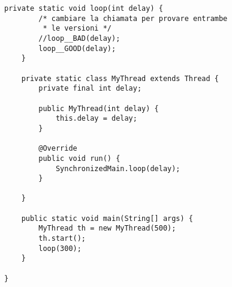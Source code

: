 \begin{lstlisting}[basicstyle=\small,]
    private static void loop(int delay) {
        /* cambiare la chiamata per provare entrambe
         * le versioni */
        //loop__BAD(delay);
        loop__GOOD(delay);
    }

    private static class MyThread extends Thread {
        private final int delay;

        public MyThread(int delay) {
            this.delay = delay;
        }

        @Override
        public void run() {
            SynchronizedMain.loop(delay);
        }

    }

    public static void main(String[] args) {
        MyThread th = new MyThread(500);
        th.start();
        loop(300);
    }

}
\end{lstlisting}




